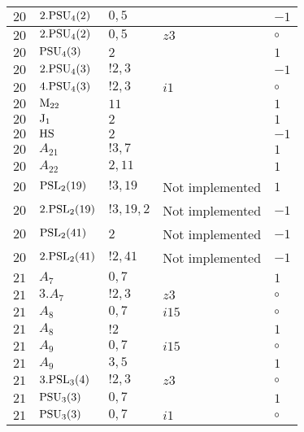 \documentclass[a4paper, 11pt]{article}
\begin{document}
\begin{longtable}{lllll}
        $ 20 $ & $ 2.{\rm PSU}_{4}(2) $ & $ 0,5 $ & $ ~ $ & $ -1$ \\ \hline
        $ 20 $ & $ 2.{\rm PSU}_{4}(2) $ & $ 0,5 $ & $ z3 $ &  $\circ$ \\ \hline
        $ 20 $ & $ {\rm PSU}_{4}(3) $ & $ 2 $ & $ ~ $ & $ 1$ \\ \hline
        $ 20 $ & $ 2.{\rm PSU}_{4}(3) $ & $ ! 2,3 $ & $ ~ $ & $ -1$ \\ \hline
        $ 20 $ & $ 4.{\rm PSU}_{4}(3) $ & $ ! 2,3 $ & $ i1 $ &  $\circ$ \\ \hline
        $ 20 $ & $ {\rm M}_{22} $ & $ 11 $ & $ ~ $ & $ 1$ \\ \hline
        $ 20 $ & $ {\rm J}_1 $ & $ 2 $ & $ ~ $ & $ 1$ \\ \hline
        $ 20 $ & $ {\rm HS} $ & $ 2 $ & $ ~ $ & $ -1$ \\ \hline
        $ 20 $ & $ A_{21} $ & $ !3, 7 $ & $ ~ $ & $ 1$ \\ \hline
        $ 20 $ & $ A_{22} $ & $ 2, 11 $ & $ ~ $ & $ 1$ \\ \hline
        $ 20 $ & $ {\rm PSL}_{2}(19) $ & $ !3, 19 $ &  Not implemented & $ 1$ \\ \hline
        $ 20 $ & $ 2.{\rm PSL}_{2}(19) $ & $ !3, 19, 2 $ &  Not implemented & $ -1$ \\ \hline
        $ 20 $ & $ {\rm PSL}_{2}(41) $ & $ 2 $ &  Not implemented & $ -1$ \\ \hline
        $ 20 $ & $ 2.{\rm PSL}_{2}(41) $ & $ !2, 41 $ &  Not implemented & $ -1$ \\ \hline
        $ 21 $ & $ A_{7} $ & $ 0,7 $ & $ ~ $ & $ 1$ \\ \hline
        $ 21 $ & $ 3.A_{7} $ & $ ! 2,3 $ & $ z3 $ &  $\circ$ \\ \hline
        $ 21 $ & $ A_{8} $ & $ 0,7 $ & $ i15 $ &  $\circ$ \\ \hline
        $ 21 $ & $ A_{8} $ & $ ! 2 $ & $ ~ $ & $ 1$ \\ \hline
        $ 21 $ & $ A_{9} $ & $ 0,7 $ & $ i15 $ &  $\circ$ \\ \hline
        $ 21 $ & $ A_{9} $ & $ 3,5 $ & $ ~ $ & $ 1$ \\ \hline
        $ 21 $ & $ 3.{\rm PSL}_{3}(4) $ & $ ! 2,3 $ & $ z3 $ &  $\circ$ \\ \hline
        $ 21 $ & $ {\rm PSU}_{3}(3) $ & $ 0,7 $ & $ ~ $ & $ 1$ \\ \hline
        $ 21 $ & $ {\rm PSU}_{3}(3) $ & $ 0,7 $ & $ i1 $ &  $\circ$ \\ \hline

\end{longtable}
\end{document}
